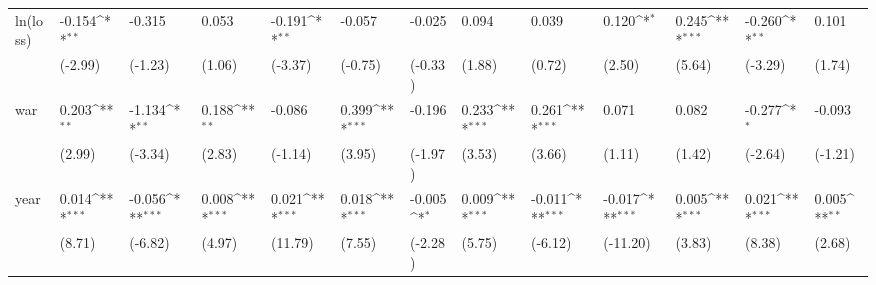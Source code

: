 \def\sym#1{\ifmmode^{#1}\else\(^{#1}\)\fi}
\begin{tabular}{p{1.5cm} p{1.7cm} p{1.7cm} p{1.7cm} p{1.7cm} p{1.7cm} p{1.7cm} p{1.7cm} p{1.7cm} p{1.7cm} p{1.7cm} p{1.7cm} p{1.7cm}}
\hline
ln(loss)        &   -0.154\sym{**} &   -0.315         &    0.053         &   -0.191\sym{**} &   -0.057         &   -0.025         &    0.094         &    0.039         &    0.120\sym{*}  &    0.245\sym{***}&   -0.260\sym{**} &    0.101         \\
                &  (-2.99)         &  (-1.23)         &   (1.06)         &  (-3.37)         &  (-0.75)         &  (-0.33)         &   (1.88)         &   (0.72)         &   (2.50)         &   (5.64)         &  (-3.29)         &   (1.74)         \\
war             &    0.203\sym{**} &   -1.134\sym{**} &    0.188\sym{**} &   -0.086         &    0.399\sym{***}&   -0.196         &    0.233\sym{***}&    0.261\sym{***}&    0.071         &    0.082         &   -0.277\sym{*}  &   -0.093         \\
                &   (2.99)         &  (-3.34)         &   (2.83)         &  (-1.14)         &   (3.95)         &  (-1.97)         &   (3.53)         &   (3.66)         &   (1.11)         &   (1.42)         &  (-2.64)         &  (-1.21)         \\
year            &    0.014\sym{***}&   -0.056\sym{***}&    0.008\sym{***}&    0.021\sym{***}&    0.018\sym{***}&   -0.005\sym{*}  &    0.009\sym{***}&   -0.011\sym{***}&   -0.017\sym{***}&    0.005\sym{***}&    0.021\sym{***}&    0.005\sym{**} \\
                &   (8.71)         &  (-6.82)         &   (4.97)         &  (11.79)         &   (7.55)         &  (-2.28)         &   (5.75)         &  (-6.12)         & (-11.20)         &   (3.83)         &   (8.38)         &   (2.68)         \\
\end{tabular}
\def\sym#1{\ifmmode^{#1}\else\(^{#1}\)\fi}
